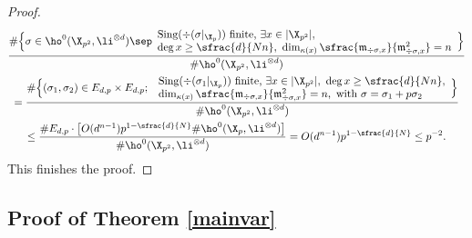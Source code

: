 \begin{proof}
\begin{multline*}
\frac{\#
\Bigl\{ \sigma\in \ho^0(\X_{p^2}, \li^{\otimes d})\sep \begin{array}{ll}
\mathrm{Sing}(\div (\sigma|_{\X_p})) \text{ finite,}\ \exists x\in |\X_{p^2}|,\\ \deg x\geq \sfrac{d}{Nn},\ \dim_{\kappa(x)}\sfrac{\mathfrak{m}_{\div \sigma,x}}{\mathfrak{m}_{\div \sigma,x}^2}=n
\end{array} \Bigr\}}{\#\ho^0(\X_{p^2}, \li^{\otimes d})}\\
=\frac{\#\Bigl\{ (\sigma_1,\sigma_2)\in E_{d,p}\times E_{d,p};\
\begin{array}{ll}
\mathrm{Sing}(\div (\sigma_1|_{\X_p})) \text{ finite,}\ \exists x\in |\X_{p^2}|,\ \deg x\geq \sfrac{d}{Nn}, \\ \dim_{\kappa(x)}\sfrac{\mathfrak{m}_{\div \sigma,x}}{\mathfrak{m}_{\div \sigma,x}^2}=n, \text{ with }\sigma=\sigma_1+p\sigma_2
\end{array}
\Bigr\}}{\#\ho^0(\X_{p^2}, \li^{\otimes d})}\\
\leq \frac{\#E_{d,p}\cdot \bigl[O(d^{n-1}) p^{1-\sfrac{d}{N}}\#\ho^0(\X_p, \li^{\otimes d})\bigr]}{\#\ho^0(\X_{p^2}, \li^{\otimes d})}=O(d^{n-1}) p^{1-\sfrac{d}{N}}\leq p^{-2}.
\end{multline*}
This finishes the proof.
\end{proof}

\subsection{Proof of Theorem \ref{mainvar}}\label{finalarakelov}

